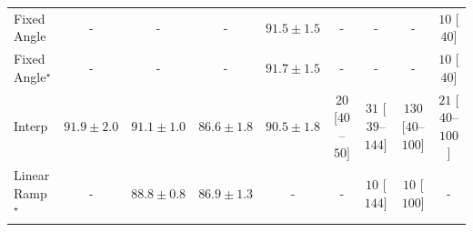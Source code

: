 \begin{tabular}{l|cccc|cccc|}
Fixed Angle & {\cellcolor[HTML]{000000}} \color[HTML]{F1F1F1} {\cellcolor{white}} \color{black} - & {\cellcolor[HTML]{000000}} \color[HTML]{F1F1F1} {\cellcolor{white}} \color{black} - & {\cellcolor[HTML]{000000}} \color[HTML]{F1F1F1} {\cellcolor{white}} \color{black} - & {\cellcolor[HTML]{006837}} \color[HTML]{F1F1F1} $91.5\pm 1.5$ & {\cellcolor[HTML]{000000}} \color[HTML]{F1F1F1} {\cellcolor{white}} \color{black} - & {\cellcolor[HTML]{000000}} \color[HTML]{F1F1F1} {\cellcolor{white}} \color{black} - & {\cellcolor[HTML]{000000}} \color[HTML]{F1F1F1} {\cellcolor{white}} \color{black} - & {\cellcolor[HTML]{FFF5F1}} \color[HTML]{000000} $10$ [$40$] \\
Fixed Angle$^\star$ & {\cellcolor[HTML]{000000}} \color[HTML]{F1F1F1} {\cellcolor{white}} \color{black} - & {\cellcolor[HTML]{000000}} \color[HTML]{F1F1F1} {\cellcolor{white}} \color{black} - & {\cellcolor[HTML]{000000}} \color[HTML]{F1F1F1} {\cellcolor{white}} \color{black} - & {\cellcolor[HTML]{006636}} \color[HTML]{F1F1F1} $91.7\pm 1.5$ & {\cellcolor[HTML]{000000}} \color[HTML]{F1F1F1} {\cellcolor{white}} \color{black} - & {\cellcolor[HTML]{000000}} \color[HTML]{F1F1F1} {\cellcolor{white}} \color{black} - & {\cellcolor[HTML]{000000}} \color[HTML]{F1F1F1} {\cellcolor{white}} \color{black} - & {\cellcolor[HTML]{FFF5F1}} \color[HTML]{000000} $10$ [$40$] \\
Interp & {\cellcolor[HTML]{006435}} \color[HTML]{F1F1F1} $91.9\pm 2.0$ & {\cellcolor[HTML]{036B38}} \color[HTML]{F1F1F1} $91.1\pm 1.0$ & {\cellcolor[HTML]{2B8E4A}} \color[HTML]{F1F1F1} $86.6\pm 1.8$ & {\cellcolor[HTML]{096F3A}} \color[HTML]{F1F1F1} $90.5\pm 1.8$ & {\cellcolor[HTML]{FFF3EF}} \color[HTML]{000000} $20$ [$40$--$50$] & {\cellcolor[HTML]{FEEFEB}} \color[HTML]{000000} $31$ [$39$--$144$] & {\cellcolor[HTML]{FDD3CF}} \color[HTML]{000000} $130$ [$40$--$100$] & {\cellcolor[HTML]{FFF2EE}} \color[HTML]{000000} $21$ [$40$--$100$] \\
Linear Ramp$^\star$ & {\cellcolor[HTML]{000000}} \color[HTML]{F1F1F1} {\cellcolor{white}} \color{black} - & {\cellcolor[HTML]{187B3F}} \color[HTML]{F1F1F1} $88.8\pm 0.8$ & {\cellcolor[HTML]{298C48}} \color[HTML]{F1F1F1} $86.9\pm 1.3$ & {\cellcolor[HTML]{000000}} \color[HTML]{F1F1F1} {\cellcolor{white}} \color{black} - & {\cellcolor[HTML]{000000}} \color[HTML]{F1F1F1} {\cellcolor{white}} \color{black} - & {\cellcolor[HTML]{FFF5F1}} \color[HTML]{000000} $10$ [$144$] & {\cellcolor[HTML]{FFF5F1}} \color[HTML]{000000} $10$ [$100$] & {\cellcolor[HTML]{000000}} \color[HTML]{F1F1F1} {\cellcolor{white}} \color{black} - \\

\end{tabular}
